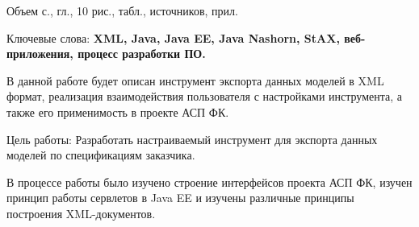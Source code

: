 \documentclass[a4paper,12pt]{diplom}
\begin{document}










\maketitle
{}

Объем  с.,  гл., 10 рис.,
 табл.,  источников,  прил.

\medskip

Ключевые слова: \textbf{XML, Java, Java EE, Java Nashorn, StAX, веб-приложения, процесс разработки ПО.}

В данной работе будет описан инструмент экспорта данных моделей в XML формат, реализация взаимодействия пользователя с настройками инструмента, а также его применимость в проекте АСП ФК.

Цель работы: Разработать настраиваемый инструмент для экспорта данных моделей по спецификациям заказчика.

В процессе работы было изучено строение интерфейсов проекта АСП ФК, изучен принцип работы сервлетов в Java EE и изучены различные принципы построения XML-документов.
\end{document}

